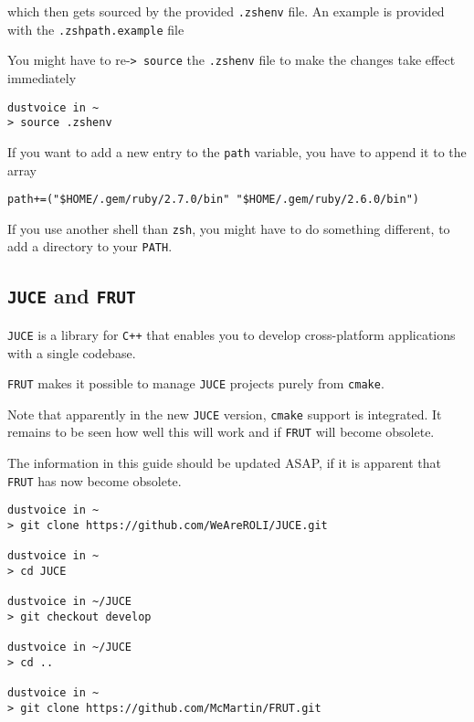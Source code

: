 \documentclass[10pt]{dustdoc}
\begin{document}
\noindent
which then gets sourced by the provided \texttt{.zshenv} file.
An example is provided with the \texttt{.zshpath.example} file

\begin{NOTE}
    You might have to re-\texttt{> source} the \texttt{.zshenv} file to make the changes take effect immediately

    \begin{verbatim}
dustvoice in ~
> source .zshenv
    \end{verbatim}

\end{NOTE}
\begin{NOTE}
    If you want to add a new entry to the \texttt{path} variable, you have to append it to the array

    \begin{verbatim}
path+=("$HOME/.gem/ruby/2.7.0/bin" "$HOME/.gem/ruby/2.6.0/bin")
    \end{verbatim}

\end{NOTE}
\begin{NOTE}
    If you use another shell than \texttt{zsh}, you might have to do something different, to add a directory to your \texttt{PATH}.

\end{NOTE}

\subsection{\texttt{JUCE} and \texttt{FRUT}}%
\label{sec:juce-and-frut}

\texttt{JUCE} is a library for \texttt{C++} that enables you to develop cross-platform applications with a single codebase.

\texttt{FRUT} makes it possible to manage \texttt{JUCE} projects purely from \texttt{cmake}.

\begin{NOTE}
    Note that apparently in the new \texttt{JUCE} version, \texttt{cmake} support is integrated.
    It remains to be seen how well this will work and if \texttt{FRUT} will become obsolete.

    The information in this guide should be updated ASAP, if it is apparent that \texttt{FRUT} has now become obsolete.
\end{NOTE}

\begin{verbatim}
dustvoice in ~
> git clone https://github.com/WeAreROLI/JUCE.git

dustvoice in ~
> cd JUCE

dustvoice in ~/JUCE
> git checkout develop

dustvoice in ~/JUCE
> cd ..

dustvoice in ~
> git clone https://github.com/McMartin/FRUT.git
\end{verbatim}
\end{document}
